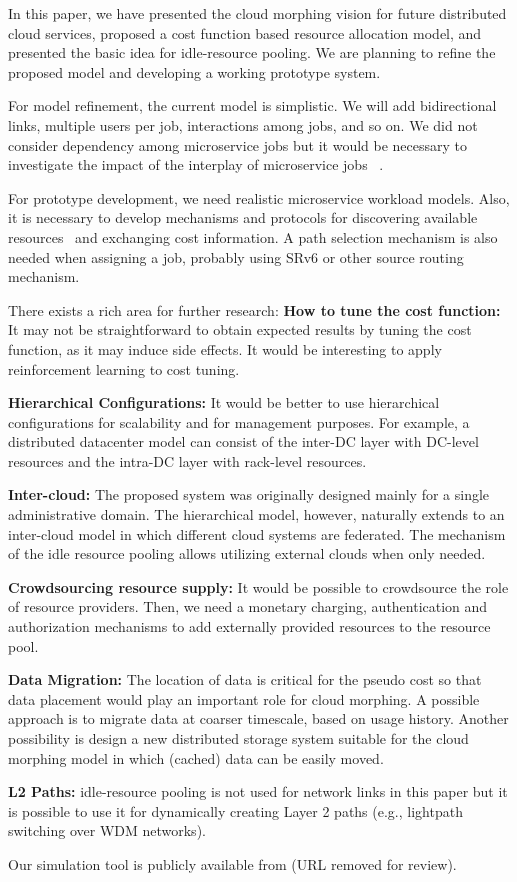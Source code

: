 
In this paper, we have presented the cloud morphing vision for
future distributed cloud services,
proposed a cost function based resource allocation model,
and presented the basic idea for idle-resource pooling.
We are planning to refine the proposed model and developing a working
prototype system.

For model refinement,
the current model is simplistic. We will add bidirectional links,
multiple users per job, interactions among jobs, and so on.
We did not consider dependency among microservice jobs but it would be
necessary to investigate the impact of the interplay of microservice
jobs ~\cite{Suresh-SOA-SOCC2017}.

For prototype development,
we need realistic microservice workload models.
Also, it is necessary to develop mechanisms and protocols for
discovering available resources~\cite{Albrecht2008} and exchanging
cost information.
A path selection mechanism is also needed when assigning a job,
probably using SRv6 or other source routing mechanism.

There exists a rich area for further research:
{\bf How to tune the cost function:}  It may not be straightforward
to obtain expected results by tuning the cost function, as it may
induce side effects.
It would be interesting to apply reinforcement learning to cost
tuning.

{\bf Hierarchical Configurations:} It would be better to use
hierarchical configurations for scalability and for management
purposes.
For example, a distributed datacenter model can consist of
the inter-DC layer with DC-level resources and the intra-DC layer
with rack-level resources.

{\bf Inter-cloud:}
The proposed system was originally designed mainly for a single
administrative domain.
The hierarchical model, however, naturally extends to an inter-cloud
model in which different cloud systems are federated.
The mechanism of the idle resource pooling allows utilizing external
clouds when only needed.

{\bf Crowdsourcing resource supply:}
It would be possible to crowdsource the role of resource providers. 
Then, we need a monetary charging, authentication and authorization
mechanisms to add externally provided resources to the resource pool.

{\bf Data Migration:}
The location of data is critical for the pseudo cost so that data
placement would play an important role for cloud morphing. 
A possible approach is to migrate data at coarser timescale, based
on usage history.
Another possibility is design a new distributed storage system
suitable for the cloud morphing model in which (cached) data can be
easily moved.

{\bf L2 Paths:}
idle-resource pooling is not used for network links in this paper but
it is possible to use it for dynamically creating Layer 2 paths (e.g.,
lightpath switching over WDM networks).

Our simulation tool is publicly available from (URL removed for
review).
